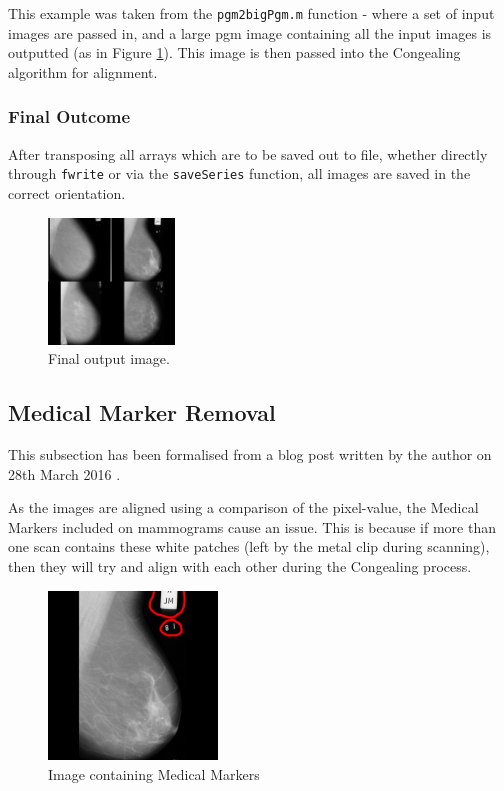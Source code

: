 This example was taken from the \texttt{pgm2bigPgm.m} function - where a set of input images are passed in, and a large pgm image containing all the input images is outputted (as in Figure \ref{fig:final-output-4}). This image is then passed into the \Gls{Congealing} algorithm for alignment.

\subsubsection{Final Outcome}

After transposing all arrays which are to be saved out to file, whether directly through \texttt{fwrite} or via the \texttt{saveSeries} function, all images are saved in the correct orientation.

\begin{figure}[H]
  \centering
  \includegraphics[width=0.3\textwidth]{Chapter2/technical-img/big_scan.jpg}
  \caption{Final output image.}
  \label{fig:final-output-4}
\end{figure}

\subsection{Medical Marker Removal}

This subsection has been formalised from a blog post written by the author on 28th March 2016 \cite{Collins_2016}.

As the images are aligned using a comparison of the pixel-value, the Medical Markers included on mammograms cause an issue. This is because if more than one scan contains these white patches (left by the metal clip during scanning), then they will try and align with each other during the \Gls{Congealing} process.

\begin{figure}[H]
  \centering
  \includegraphics[width=0.4\textwidth]{Chapter2/technical-img/mdb196.png}
  \caption{Image containing Medical Markers}
  \label{fig:med-markers}
\end{figure}


